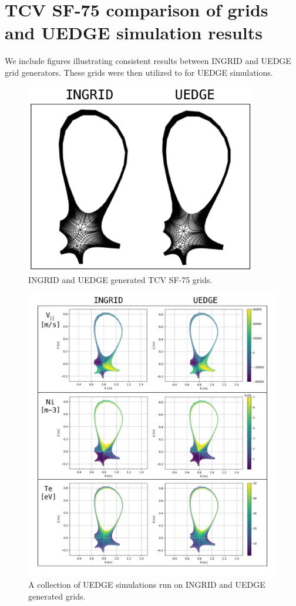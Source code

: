 \section{TCV SF-75 comparison of grids and UEDGE simulation results}
We include figures illustrating consistent results between INGRID and UEDGE grid generators. These grids were then utilized to for UEDGE simulations.
\begin{figure}[H]
    \centering
        \includegraphics[width=0.9\textwidth]{figures/benchmark/gridue_both.pdf}
        \caption{INGRID and UEDGE generated TCV SF-75 grids.}
        \label{fig:ingrid_grid}
\end{figure}
\begin{figure}[H]
    \centering
        \includegraphics[width=\textwidth]{figures/benchmark/BenchmarkCollection.pdf}
        \caption{A collection of UEDGE simulations run on INGRID and UEDGE generated grids.}
        \label{fig:benchmark_collection}
\end{figure}

